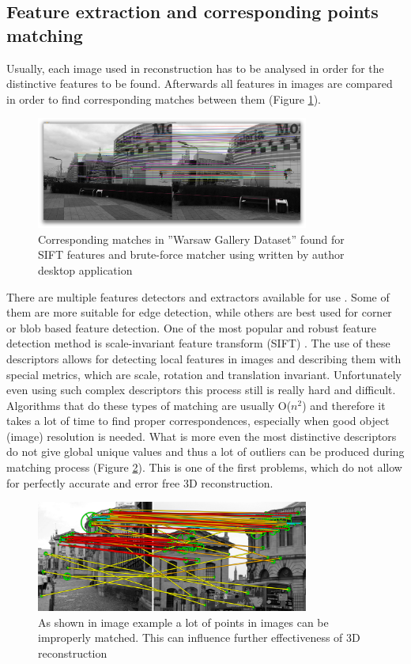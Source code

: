 \subsection{Feature extraction and corresponding points matching}
Usually, each image used in reconstruction has to be analysed in order for the distinctive features to be found. Afterwards all features in images are compared in order to find corresponding matches between them (Figure \ref{fig:correspondingMatches}).
\begin{figure}[h]
    \centering
    \includegraphics[width=0.8\textwidth]{correspondingMatching}
    \caption{Corresponding matches in ''Warsaw Gallery Dataset'' found for SIFT features and brute-force matcher using written by author desktop application}
    \label{fig:correspondingMatches}
\end{figure}
There are multiple features detectors and extractors available for use \cite{website:featureDetection}. Some of them are more suitable for edge detection, while others are best used for corner or blob based feature detection. One of the most popular and robust feature detection method is scale-invariant feature transform (SIFT) \cite{website:SIFT}. The use of these descriptors allows for detecting local features in images and describing them with special metrics, which are scale, rotation and translation invariant. Unfortunately even using such complex descriptors this process still is really hard and difficult. Algorithms that do these types of matching are usually O($n^2$) and therefore it takes a lot of time to find proper correspondences, especially when good object (image) resolution is needed. What is more even the most distinctive descriptors do not give global unique values and thus a lot of outliers can be produced during matching process (Figure \ref{fig:failMatching}). This is one of the first problems, which do not allow for perfectly accurate and error free 3D reconstruction.
\begin{figure}[ht!]
    \centering
    \includegraphics[width=0.8\textwidth]{failMatching}
    \caption[Outliers found during matching correspondences in two architecture pictures]{As shown in image example a lot of points in images can be improperly matched. This can influence further effectiveness of 3D reconstruction \cite{website:failMatching} }
    \label{fig:failMatching}
\end{figure}
